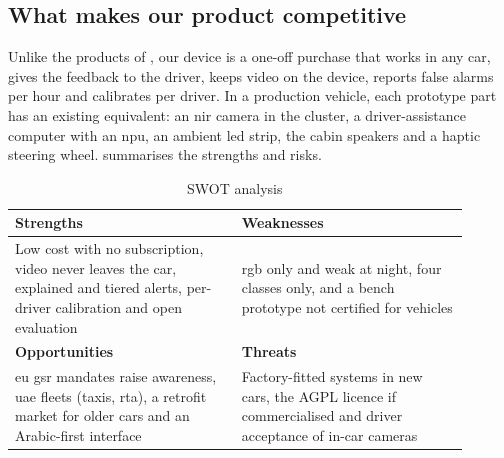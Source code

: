 \subsection{What makes our product competitive}

Unlike the products of , our device is a one-off purchase that works in any car, gives the feedback to the driver, keeps video on the device, reports false alarms per hour and calibrates per driver. In a production vehicle, each prototype part has an existing equivalent: an \gls{nir} camera in the cluster, a driver-assistance computer with an \gls{npu}, an ambient \gls{led} strip, the cabin speakers and a haptic steering wheel.  summarises the strengths and risks.

\begin{table}[htbp]
\centering
\caption{SWOT analysis}
\label{tab:ch4-20}
\footnotesize
\setlength{\tabcolsep}{4pt}
\renewcommand{\arraystretch}{1.2}
\begin{tabular}{|p{0.45\linewidth}|p{0.45\linewidth}|}
\hline
\cellcolor{out1!15}\textbf{Strengths} & \cellcolor{oth1!15}\textbf{Weaknesses} \\
\hline
Low cost with no subscription, video never leaves the car, explained and tiered alerts, per-driver calibration and open evaluation & \gls{rgb} only and weak at night, four classes only, and a bench prototype not certified for vehicles \\
\hline
\cellcolor{own1!15}\textbf{Opportunities} & \cellcolor{oth2!20}\textbf{Threats} \\
\hline
\gls{eu} \gls{gsr} mandates raise awareness, \gls{uae} fleets (taxis, \gls{rta}), a retrofit market for older cars and an Arabic-first interface & Factory-fitted systems in new cars, the AGPL licence if commercialised and driver acceptance of in-car cameras \\
\hline
\end{tabular}
\end{table}
